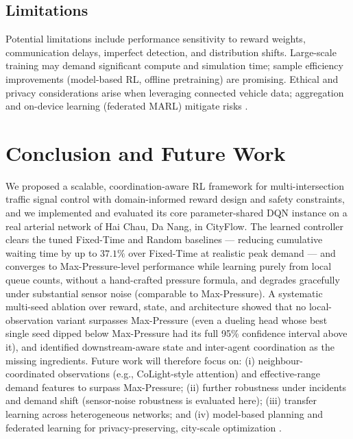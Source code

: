 \documentclass[12pt]{report} %
\begin{document}
\section{Limitations}

Potential limitations include performance sensitivity to reward weights, communication delays, imperfect detection, and distribution shifts. Large-scale training may demand significant compute and simulation time; sample efficiency improvements (model-based RL, offline pretraining) are promising. Ethical and privacy considerations arise when leveraging connected vehicle data; aggregation and on-device learning (federated MARL) mitigate risks \cite{Ye_2021}.

\chapter{Conclusion and Future Work}

We proposed a scalable, coordination-aware RL framework for multi-intersection traffic signal control with domain-informed reward design and safety constraints, and we implemented and evaluated its core parameter-shared DQN instance on a real arterial network of Hai Chau, Da Nang, in CityFlow. The learned controller clears the tuned Fixed-Time and Random baselines --- reducing cumulative waiting time by up to $37.1\%$ over Fixed-Time at realistic peak demand --- and converges to Max-Pressure-level performance while learning purely from local queue counts, without a hand-crafted pressure formula, and degrades gracefully under substantial sensor noise (comparable to Max-Pressure). A systematic multi-seed ablation over reward, state, and architecture showed that no local-observation variant surpasses Max-Pressure (even a dueling head whose best single seed dipped below Max-Pressure had its full 95\% confidence interval above it), and identified downstream-aware state and inter-agent coordination as the missing ingredients. Future work will therefore focus on: (i) neighbour-coordinated observations (e.g., CoLight-style attention) and effective-range demand features to surpass Max-Pressure; (ii) further robustness under incidents and demand shift (sensor-noise robustness is evaluated here); (iii) transfer learning across heterogeneous networks; and (iv) model-based planning and federated learning for privacy-preserving, city-scale optimization \cite{FederatedMARL_TRC2024,ModelBased_TSC_2024}.

\cleardoublepage
{}


\end{document}
